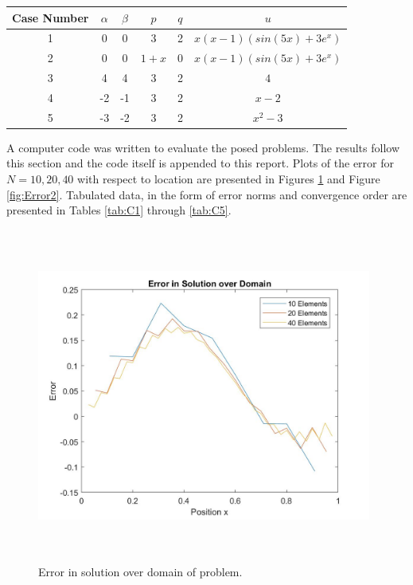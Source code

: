 \documentclass[a4paper, 12pt]{article}
\begin{document}
\begin{center}
\begin{tabular}{ |c|c|c|c|c|c|}
  \hline
  Case Number & $\alpha$ & $\beta$ & $p$ & $q$ & $u$ \\
  \hline
  1           &   0      &  0      &  3  &  2  &  $x(x-1)(sin(5x)+3e^x)$ \\
  \hline
  2           &   0      &  0      &  $1+x$  &  0  &  $x(x-1)(sin(5x)+3e^x)$ \\
  \hline
  3           &   4      &  4      &  3  &  2  &  $4$ \\
  \hline
  4           &   -2     &  -1     &  3  &  2  &  $x-2$ \\
  \hline
  5           &   -3     &  -2     &  3  &  2  &  $x^2-3$ \\
  \hline
\end{tabular} \label{tab:Cases}
\end{center}

\noindent
A computer code was written to evaluate the posed problems. 
The results follow this section and the code itself is appended to this report.
Plots of the error for $N = 10, 20, 40$ with respect to location are
presented in Figures \ref{fig:Error1} and Figure \ref{fig:Error2}.
Tabulated data, in the form of error norms and convergence order 
are presented in Tables \ref{tab:C1} through \ref{tab:C5}.

\begin{figure}[H]
  \centering
  \includegraphics[width=11cm, height=11cm]{error}
  \caption{ Error in solution over domain of problem.}
  \label{fig:Error1}
\end{figure}
\end{document}
